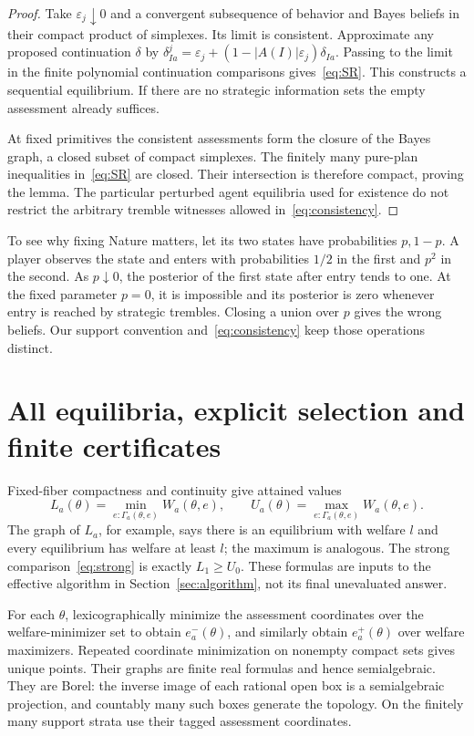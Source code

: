 \documentclass[11pt,a4paper]{article}
\numberwithin{equation}{section}
\theoremstyle{definition}
\begin{document}
\begin{proof}
Take $\varepsilon_j\downarrow0$ and a convergent subsequence of behavior
and Bayes beliefs in their compact product of simplexes. Its limit is
consistent. Approximate any proposed continuation $\delta$ by
$\delta^j_{Ia}=\varepsilon_j+(1-|A(I)|\varepsilon_j)\delta_{Ia}$.
Passing to the limit in the finite polynomial continuation comparisons
gives~\eqref{eq:SR}. This constructs a sequential equilibrium. If there
are no strategic information sets the empty assessment already suffices.

At fixed primitives the consistent assessments form the closure of the
Bayes graph, a closed subset of compact simplexes. The finitely many
pure-plan inequalities in~\eqref{eq:SR} are closed. Their intersection
is therefore compact, proving the lemma. The particular perturbed agent
equilibria used for existence do not restrict the arbitrary tremble
witnesses allowed in~\eqref{eq:consistency}.
\end{proof}

To see why fixing Nature matters, let its two states have probabilities
$p,1-p$. A player observes the state and enters with probabilities
$1/2$ in the first and $p^2$ in the second. As $p\downarrow0$, the
posterior of the first state after entry tends to one. At the fixed
parameter $p=0$, it is impossible and its posterior is zero whenever
entry is reached by strategic trembles. Closing a union over $p$ gives
the wrong beliefs. Our support convention and~\eqref{eq:consistency}
keep those operations distinct.

\section{All equilibria, explicit selection and finite certificates}\label{sec:selection}

Fixed-fiber compactness and continuity give attained values
\begin{equation}\label{eq:extrema}
 L_a(\theta)=\min_{e:\Gamma_a(\theta,e)}W_a(\theta,e),\qquad
 U_a(\theta)=\max_{e:\Gamma_a(\theta,e)}W_a(\theta,e).
\end{equation}
The graph of $L_a$, for example, says there is an equilibrium with welfare
$l$ and every equilibrium has welfare at least $l$; the maximum is analogous.
The strong comparison~\eqref{eq:strong} is exactly $L_1\ge U_0$.
These formulas are inputs to the effective algorithm in
Section~\ref{sec:algorithm}, not its final unevaluated answer.

For each $\theta$, lexicographically minimize the assessment coordinates
over the welfare-minimizer set to obtain $e_a^-(\theta)$, and similarly
obtain $e_a^+(\theta)$ over welfare maximizers. Repeated coordinate
minimization on nonempty compact sets gives unique points. Their graphs
are finite real formulas and hence semialgebraic. They are Borel: the
inverse image of each rational open box is a semialgebraic projection,
and countably many such boxes generate the topology. On the finitely
many support strata use their tagged assessment coordinates.
\end{document}
